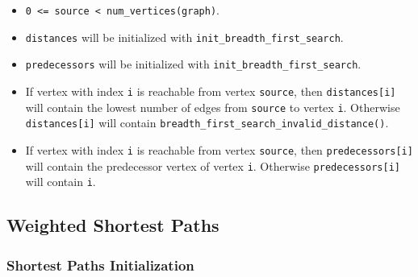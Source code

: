 \begin{itemdescr}
      \pnum\preconditions
            \begin{itemize}
                  \item
                        \lstinline{0 <= source < num_vertices(graph)}. 
                  \item
                        \lstinline{distances} will be initialized with \lstinline{init_breadth_first_search}.
                  \item
                        \lstinline{predecessors} will be initialized with \lstinline{init_breadth_first_search}.
            \end{itemize}
      \pnum\effects
            \begin{itemize}
                  \item
                        If vertex with index \lstinline{i} is reachable from vertex \lstinline{source}, then
                        \lstinline{distances[i]} will contain the lowest number of edges from \lstinline{source} to vertex
                        \lstinline{i}.  Otherwise \lstinline{distances[i]} will contain
                        \lstinline{breadth_first_search_invalid_distance()}.
                  \item
                        If vertex with index \lstinline{i} is reachable
                        from vertex \lstinline{source}, then \lstinline{predecessors[i]} will contain the
                        predecessor vertex of vertex \lstinline{i}. Otherwise \lstinline{predecessors[i]} will contain
                        \lstinline{i}.
            \end{itemize}
\end{itemdescr}


\subsection{Weighted Shortest Paths}

\subsubsection{Shortest Paths Initialization}

